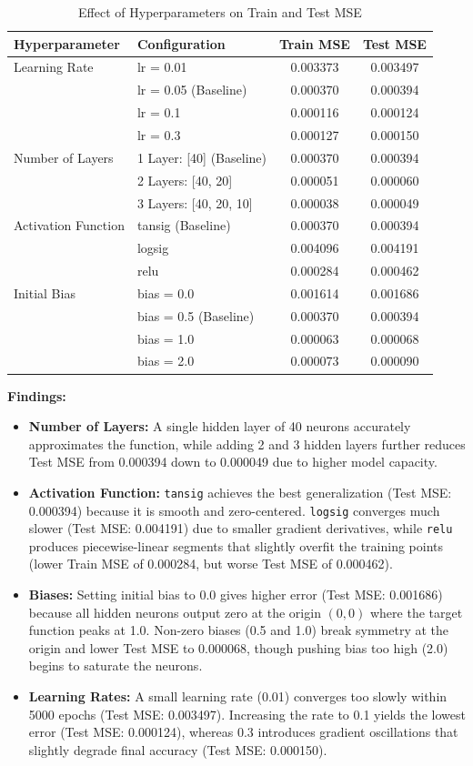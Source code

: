 \documentclass[11pt]{article}
\begin{document}
\begin{table}[h!]
\centering
\begin{tabular}{|l|l|c|c|}
\hline
\textbf{Hyperparameter} & \textbf{Configuration} & \textbf{Train MSE} & \textbf{Test MSE} \tabularnewline \hline
Learning Rate & lr = 0.01 & 0.003373 & 0.003497 \tabularnewline
              & lr = 0.05 (Baseline) & 0.000370 & 0.000394 \tabularnewline
              & lr = 0.1 & 0.000116 & 0.000124 \tabularnewline
              & lr = 0.3 & 0.000127 & 0.000150 \tabularnewline \hline
Number of Layers & 1 Layer: [40] (Baseline) & 0.000370 & 0.000394 \tabularnewline
                 & 2 Layers: [40, 20] & 0.000051 & 0.000060 \tabularnewline
                 & 3 Layers: [40, 20, 10] & 0.000038 & 0.000049 \tabularnewline \hline
Activation Function & tansig (Baseline) & 0.000370 & 0.000394 \tabularnewline
                    & logsig & 0.004096 & 0.004191 \tabularnewline
                    & relu & 0.000284 & 0.000462 \tabularnewline \hline
Initial Bias & bias = 0.0 & 0.001614 & 0.001686 \tabularnewline
             & bias = 0.5 (Baseline) & 0.000370 & 0.000394 \tabularnewline
             & bias = 1.0 & 0.000063 & 0.000068 \tabularnewline
             & bias = 2.0 & 0.000073 & 0.000090 \tabularnewline \hline
\end{tabular}
\caption{Effect of Hyperparameters on Train and Test MSE}
\end{table}

\noindent \textbf{Findings:}
\begin{itemize}
    \item \textbf{Number of Layers:} A single hidden layer of 40 neurons accurately approximates the function, while adding 2 and 3 hidden layers further reduces Test MSE from 0.000394 down to 0.000049 due to higher model capacity.
    \item \textbf{Activation Function:} \texttt{tansig} achieves the best generalization (Test MSE: 0.000394) because it is smooth and zero-centered. \texttt{logsig} converges much slower (Test MSE: 0.004191) due to smaller gradient derivatives, while \texttt{relu} produces piecewise-linear segments that slightly overfit the training points (lower Train MSE of 0.000284, but worse Test MSE of 0.000462).
    \item \textbf{Biases:} Setting initial bias to 0.0 gives higher error (Test MSE: 0.001686) because all hidden neurons output zero at the origin $(0,0)$ where the target function peaks at 1.0. Non-zero biases (0.5 and 1.0) break symmetry at the origin and lower Test MSE to 0.000068, though pushing bias too high (2.0) begins to saturate the neurons.
    \item \textbf{Learning Rates:} A small learning rate (0.01) converges too slowly within 5000 epochs (Test MSE: 0.003497). Increasing the rate to 0.1 yields the lowest error (Test MSE: 0.000124), whereas 0.3 introduces gradient oscillations that slightly degrade final accuracy (Test MSE: 0.000150).
\end{itemize}
\end{document}
